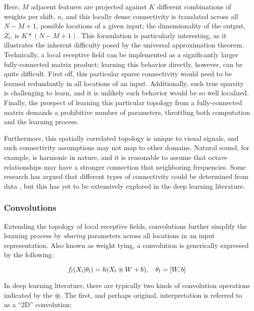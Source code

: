 \noindent Here, $M$ adjacent features are projected against $K$ different combinations of weights per shift, $n$, and this locally dense connectivity is translated across all $N-M+1$, possible locations of a given input;
the dimensionality of the output, $Z_l$, is $K*(N-M+1)$.
This formulation is particularly interesting, as it illustrates the inherent difficulty posed by the universal approximation theorem.
Technically, a local receptive field can be implemented as a significantly larger fully-connected matrix product;
learning this behavior directly, however, can be quite difficult.
First off, this particular sparse connectivity would need to be learned redundantly in all locations of an input.
Additionally, such true sparsity is challenging to learn, and it is unlikely such behavior would be so well localized.
Finally, the prospect of learning this particular topology from a fully-connected matrix demands a prohibitive number of parameters, throttling both computation and the learning process.

Furthermore, this spatially correlated topology is unique to visual signals, and such connectivity assumptions may not map to other domains.
Natural sound, for example, is harmonic in nature, and it is reasonable to assume that octave relationships may have a stronger connection that neighboring frequencies.
Some research has argued that different types of connectivity could be determined from data \cite{Coates2012Learning}, but this has yet to be extensively explored in the deep learning literature.


\subsubsection{Convolutions}

Extending the topology of local receptive fields, convolutions further simplify the learning process by \emph{sharing} parameters across all locations in an input representation.
Also known as weight tying, a convolution is generically expressed by the following:

\begin{equation}
\label{eq:convlayer}
\small
f_l(X_l \vert \theta_l) = h(X_{l} \circledast W + b), \quad \theta_l = [W, b]
\end{equation}

\noindent In deep learning literature, there are typically two kinds of convolution operations indicated by the $\circledast$.
The first, and perhaps original, interpretation is referred to as a ``2D'' convolution:

